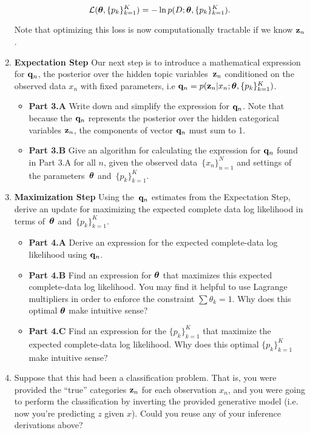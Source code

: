 \documentclass[submit]{harvardml}
\begin{document}
\begin{problem}
\begin{enumerate}
\[\mathcal{L}(\boldsymbol{\theta}, \{p_k\}^K_{k=1}) =  -\ln p(D; \boldsymbol{\theta}, \{p_k\}^K_{k=1}).\]

Note that optimizing
  this loss is now computationally tractable if we know $\mathbf{z}_n$.

\item \textbf{Expectation Step} Our next step is to introduce a
  mathematical expression for $\mathbf{q}_n$, the posterior over the
  hidden topic variables~$\mathbf{z}_n$ conditioned on the observed data
  $x_n$ with fixed parameters, i.e $\mathbf{q}_n = p(\mathbf{z}_n | x_n;
  \boldsymbol{\theta}, \{ p_k \}^K_{k=1})$.

\begin{itemize}
\item  \textbf{Part 3.A } Write down and simplify the expression for $\mathbf{q}_n$.  Note that because the $\mathbf{q}_n$ represents the posterior over the hidden categorical variables $\mathbf{z}_n$, the components of vector $\mathbf{q}_n$ must sum to 1.

\item  \textbf{Part 3.B } Give an algorithm for calculating the expression for $\mathbf{q}_n$ found in Part 3.A for all $n$, given the observed data~$\{x_n\}^N_{n=1}$ and settings of the parameters~$\boldsymbol{\theta}$ and~$\{ p_k\}^K_{k=1}$.

\end{itemize}

\item \textbf{Maximization Step}
Using the~$\mathbf{q}_n$ estimates from the Expectation Step, derive an update for maximizing the expected complete data log likelihood in terms of~$\boldsymbol{\theta}$ and~$\{ p_k \}^K_{k=1}$.

\begin{itemize}
    \item \textbf{Part 4.A } Derive an expression for the expected complete-data log likelihood using $\mathbf{q}_n$.
    \item \textbf{Part 4.B } Find an expression for $\boldsymbol{\theta}$ that maximizes this expected complete-data log likelihood. You may find it helpful to use Lagrange multipliers in order to enforce the constraint $\sum \theta_k = 1$. Why does this optimal $\boldsymbol{\theta}$ make intuitive sense?
    \item \textbf{Part 4.C } Find an expression for the $\{p_k \}^K_{k = 1}$ that maximize the expected
      complete-data log likelihood.  Why does this optimal $\{p_k \}^K_{k = 1}$  make intuitive sense?
\end{itemize}

\item Suppose that this had been a classification problem. That is,
  you were provided the ``true'' categories $\mathbf{z}_n$ for each observation $x_n$,
  and you were going to perform the classification by
  inverting the provided generative model (i.e. now you're predicting $z$ given $x$). Could you reuse any of
  your inference derivations above?
  

\end{enumerate}
\end{problem}
\end{document}
